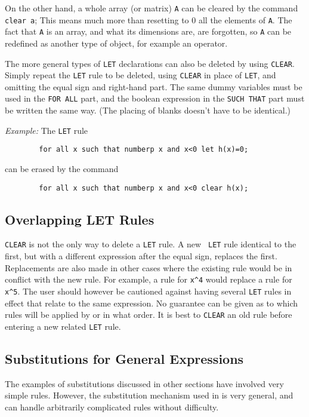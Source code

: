 On the other hand, a whole array (or matrix) {\tt A} can be cleared by the
command {\tt clear a};  This means much more than resetting to 0 all the
elements of {\tt A}.  The fact that {\tt A} is an array, and what its
dimensions are, are forgotten, so {\tt A} can be redefined as another type
of object, for example an operator.

The more general types of {\tt LET} declarations can also be deleted by
using {\tt CLEAR}.  Simply repeat the {\tt LET} rule to be deleted, using
{\tt CLEAR} in place of {\tt LET}, and omitting the equal sign and
right-hand part.  The same dummy variables must be used in the {\tt FOR
ALL} part, and the boolean expression in the {\tt SUCH THAT} part must be
written the same way. (The placing of blanks doesn't have to be
identical.)

{\it Example:} The {\tt LET} rule
\begin{verbatim}
        for all x such that numberp x and x<0 let h(x)=0;
\end{verbatim}
can be erased by the command
\begin{verbatim}
        for all x such that numberp x and x<0 clear h(x);
\end{verbatim}

\subsection{Overlapping LET Rules}
{\tt CLEAR} is not the only way to delete a {\tt LET} rule.  A new {\tt
LET} rule identical to the first, but with a different expression after
the equal sign, replaces the first.  Replacements are also made in other
cases where the existing rule would be in conflict with the new rule.  For
example, a rule for {\tt x\verb|^|4} would replace a rule for {\tt x\verb|^|5}.
The user should however be cautioned against having several {\tt LET}
rules in effect that relate to the same expression.  No guarantee can be
given as to which rules will be applied by {\REDUCE} or in what order.  It
is best to {\tt CLEAR} an old rule before entering a new related {\tt LET}
rule.

\subsection{Substitutions for General Expressions}
\label{sec-gensubs}
The examples of substitutions discussed in other sections have involved
very simple rules. However, the substitution mechanism used in {\REDUCE} is
very general, and can handle arbitrarily complicated rules without
difficulty.

